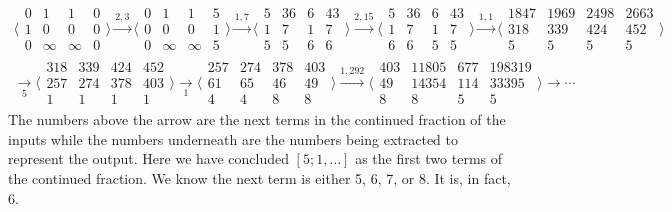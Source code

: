 \documentclass[12pt]{article}
\begin{document}
\begin{multline*}
\big\langle\begin{smallmatrix}
  0 & 1 & 1 & 0\\
  1 & 0 & 0 & 0\\
  0 & \infty & \infty & 0
\end{smallmatrix}\big\rangle
\xrightarrow{2, 3}
\big\langle\begin{smallmatrix}
  0 & 1 & 1 & 5\\
  0 & 0 & 0 & 1\\
  0 & \infty & \infty & 5 
\end{smallmatrix}\big\rangle
\xrightarrow{1, 7}
\big\langle\begin{smallmatrix}
  5 & 36 & 6 & 43\\
  1 & 7 & 1 & 7\\
  5 & 5 & 6 & 6 
\end{smallmatrix}\big\rangle
\xrightarrow{2, 15}
\big\langle\begin{smallmatrix}
  5 & 36 & 6 & 43\\
  1 & 7 & 1 & 7 \\
  6 & 6 & 5 & 5 
\end{smallmatrix}\big\rangle
\xrightarrow{1, 1}
\big\langle\begin{smallmatrix}
  1847 & 1969 & 2498 & 2663\\
  318 & 339 & 424 & 452 \\
  5 & 5 & 5 & 5 
\end{smallmatrix}\big\rangle \\
\xrightarrow[5]{}
\big\langle\begin{smallmatrix}
  318 &339 & 424  & 452\\
  257 & 274 & 378 & 403 \\
  1 & 1 & 1 & 1
\end{smallmatrix}\big\rangle
\xrightarrow[1]{}
\big\langle\begin{smallmatrix}
  257 &274 & 378  & 403\\
  61 & 65 & 46 & 49 \\
  4 & 4 & 8 & 8
\end{smallmatrix}\big\rangle
\xrightarrow{1, 292}
\big\langle\begin{smallmatrix}
  403 & 11805 & 677 & 198319 \\
  49 & 14354 & 114 & 33395 \\
  8 & 8 & 5 & 5 
\end{smallmatrix}\big\rangle
\xrightarrow{}\cdots
\end{multline*}
The numbers above the arrow are the next terms in the continued fraction of the inputs while the numbers underneath are the numbers being extracted to represent the output. Here we have concluded $[5; 1, \ldots]$ as the first two terms of the continued fraction. We know the next term is either 5, 6, 7, or 8. It is, in fact, 6. 
\end{document}
